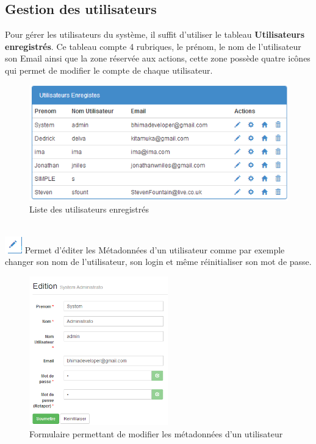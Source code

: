 \documentclass[12pt,a4paper]{report}
\begin{document}
\subsection{Gestion des utilisateurs}
Pour gérer les utilisateurs du système, il suffit d'utiliser le tableau \textbf{Utilisateurs enregistrés}. Ce tableau compte 4 rubriques, le prénom, le nom de l'utilisateur son Email ainsi que la zone réservée aux actions, cette zone possède quatre icônes qui permet de modifier le compte de chaque utilisateur.
\begin{figure}[h]
\begin{center}
\includegraphics[width=12cm]{pic/ListUser.png}
\end{center}
\caption{Liste des utilisateurs enregistrés}
\label{Liste des utilisateurs enregistrés}
\end{figure}
\\
 \includegraphics[scale=1]{pic/EditUser.png} Permet d'éditer les Métadonnées d'un utilisateur comme par exemple changer son nom de l'utilisateur, son login et même réinitialiser son mot de passe.
\\ 
 \begin{figure}[h]
\begin{center}
\includegraphics[width=6cm]{pic/UpdateUser.png}
\end{center}
\caption{Formulaire permettant de modifier les métadonnées d'un utilisateur}
\label{Formulaire permettant de modifier les métadonnées d'un utilisateur}
\end{figure}
\end{document}
